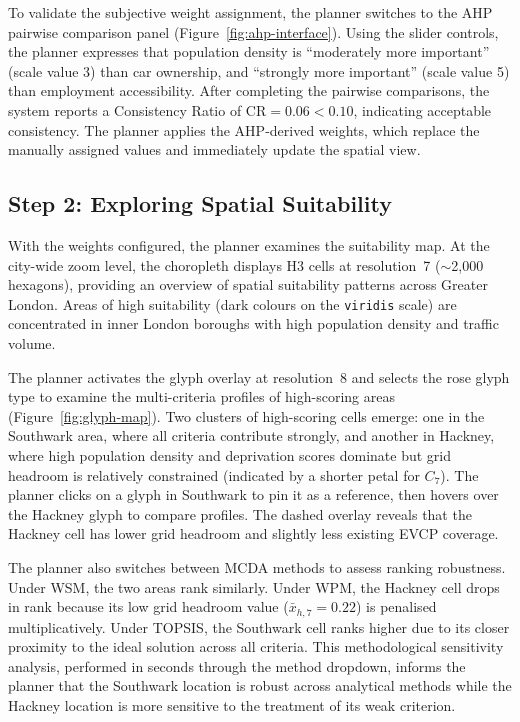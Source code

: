 To validate the subjective weight assignment, the planner switches to the AHP pairwise comparison panel (Figure~\ref{fig:ahp-interface}). Using the slider controls, the planner expresses that population density is ``moderately more important'' (scale value 3) than car ownership, and ``strongly more important'' (scale value 5) than employment accessibility. After completing the pairwise comparisons, the system reports a Consistency Ratio of $\text{CR} = 0.06 < 0.10$, indicating acceptable consistency. The planner applies the AHP-derived weights, which replace the manually assigned values and immediately update the spatial view.

\subsection{Step 2: Exploring Spatial Suitability}
\label{sec:uc-spatial}

With the weights configured, the planner examines the suitability map. At the city-wide zoom level, the choropleth displays H3 cells at resolution~7 ($\sim$2,000 hexagons), providing an overview of spatial suitability patterns across Greater London. Areas of high suitability (dark colours on the \texttt{viridis} scale) are concentrated in inner London boroughs with high population density and traffic volume.

The planner activates the glyph overlay at resolution~8 and selects the rose glyph type to examine the multi-criteria profiles of high-scoring areas (Figure~\ref{fig:glyph-map}). Two clusters of high-scoring cells emerge: one in the Southwark area, where all criteria contribute strongly, and another in Hackney, where high population density and deprivation scores dominate but grid headroom is relatively constrained (indicated by a shorter petal for $C_7$). The planner clicks on a glyph in Southwark to pin it as a reference, then hovers over the Hackney glyph to compare profiles. The dashed overlay reveals that the Hackney cell has lower grid headroom and slightly less existing EVCP coverage.

The planner also switches between MCDA methods to assess ranking robustness. Under WSM, the two areas rank similarly. Under WPM, the Hackney cell drops in rank because its low grid headroom value ($\bar{x}_{h,7} = 0.22$) is penalised multiplicatively. Under TOPSIS, the Southwark cell ranks higher due to its closer proximity to the ideal solution across all criteria. This methodological sensitivity analysis, performed in seconds through the method dropdown, informs the planner that the Southwark location is robust across analytical methods while the Hackney location is more sensitive to the treatment of its weak criterion.

